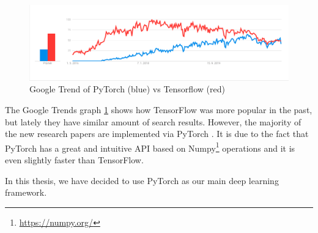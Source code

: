 \begin{figure}[ht]
    \centering
    \includegraphics[width=1.0\textwidth]{resources/implementation/dp-framework-trend.png}
    \caption{Google Trend of PyTorch (blue) vs Tensorflow (red)}
    \label{fig:dp-framework-trend}
\end{figure}

The Google Trends graph \ref{fig:dp-framework-trend} shows how TensorFlow was more popular in the past, but lately they have similar amount of search results. However, the majority of the new research papers are implemented via PyTorch \cite{pytorch-data}. It is due to the fact that PyTorch has a great and intuitive API based on Numpy\footnote{\url{https://numpy.org/}} operations and it is even slightly faster than TensorFlow.

In this thesis, we have decided to use PyTorch as our main deep learning framework.


